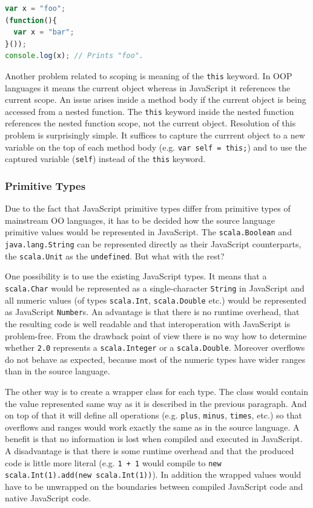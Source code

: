 \documentclass[12pt,a4paper]{report}
\begin{document}
\begin{lstlisting}[language=JavaScript,caption={Emulation of block scope in JavaScript.},label={lst:JavaScriptBlockScoping}]
var x = "foo";
(function(){ 
  var x = "bar";
}());
console.log(x); // Prints "foo".
\end{lstlisting}

Another problem related to scoping is meaning of the \texttt{this} keyword. In OOP languages it means the current object whereas in JavaScript it references the current scope. An issue arises inside a method body if the current object is being accessed from a nested function. The \texttt{this} keyword inside the nested function references the nested function scope, not the current object. Resolution of this problem is surprisingly simple. It suffices to capture the currrent object to a new variable on the top of each method body (e.g. \texttt{var self = this;}) and to use the captured variable (\texttt{self}) instead of the \texttt{this} keyword.

\subsubsection*{Primitive Types}

Due to the fact that JavaScript primitive types differ from primitive types of mainstream OO languages, it has to be decided how the source language primitive values  would be represented in JavaScript. The \texttt{scala.Boolean} and \texttt{java.lang.String} can be represented directly as their JavaScript counterparts, the \texttt{scala.Unit} as the \texttt{undefined}. But what with the rest? 

One possibility is to use the existing JavaScript types. It means that a \texttt{scala.Char} would be represented as a single-character \texttt{String} in JavaScript and all numeric values (of types \texttt{scala.Int}, \texttt{scala.Double} etc.) would be represented as JavaScript \texttt{Number}s. An advantage is that there is no runtime overhead, that the resulting code is well readable and that interoperation with JavaScript is problem-free. From the drawback point of view there is no way how to determine whether \texttt{2.0} represents a \texttt{scala.Integer} or a \texttt{scala.Double}. Moreover overflows do not behave as expected, because most of the numeric types have wider ranges than in the source language.

The other way is to create a wrapper class for each type. The class would contain the value represented same way as it is described in the previous paragraph. And on top of that it will define all operations (e.g. \texttt{plus}, \texttt{minus}, \texttt{times}, etc.) so that overflows and ranges would work exactly the same as in the source language. A benefit is that no information is lost when compiled and executed in JavaScript. A disadvantage is that there is some runtime overhead and that the produced code is little more literal (e.g. \texttt{1 + 1} would compile to \texttt{new scala.Int(1).add(new scala.Int(1))}). In addition the wrapped values would have to be unwrapped on the boundaries between compiled JavaScript code and native JavaScript code. 
\end{document}
